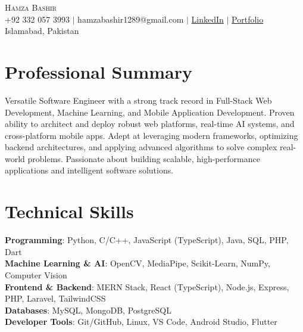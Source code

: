 \documentclass[letterpaper,11pt]{article}
\begin{document}
\begin{center}
    {\Huge \scshape Hamza Bashir} \\ \vspace{3pt}
    \small +92 332 057 3993 $|$ hamzabashir1289@gmail.com $|$ 
    \href{https://linkedin.com/in/hamza-bashir-a56281247/}{LinkedIn} $|$ 
    \href{https://hamzabashir.vercel.app}{Portfolio} \\
    Islamabad, Pakistan
    \vspace{-8pt}
\end{center}

\section{Professional Summary}
\small{Versatile Software Engineer with a strong track record in Full-Stack Web Development, Machine Learning, and Mobile Application Development. Proven ability to architect and deploy robust web platforms, real-time AI systems, and cross-platform mobile apps. Adept at leveraging modern frameworks, optimizing backend architectures, and applying advanced algorithms to solve complex real-world problems. Passionate about building scalable, high-performance applications and intelligent software solutions.}
\vspace{-3pt}

\section{Technical Skills}
 \begin{itemize}[leftmargin=0.15in, label={}]
    \small{\item{
     \textbf{Programming}{: Python, C/C++, JavaScript (TypeScript), Java, SQL, PHP, Dart} \\
     \textbf{Machine Learning \& AI}{: OpenCV, MediaPipe, Scikit-Learn, NumPy, Computer Vision} \\
     \textbf{Frontend \& Backend}{: MERN Stack, React (TypeScript), Node.js, Express, PHP, Laravel, TailwindCSS} \\
     \textbf{Databases}{: MySQL, MongoDB, PostgreSQL} \\
     \textbf{Developer Tools}{: Git/GitHub, Linux, VS Code, Android Studio, Flutter}
    }}
 \end{itemize}
 \vspace{-16pt}
\end{document}
